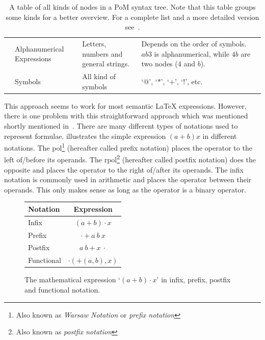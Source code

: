 \documentclass[a4paper,11pt]{article}
\theoremstyle{defTheoStyle}
\theoremstyle{defExampStyle}
\begin{document}
\begin{table}[t!]
\begin{tabularx}{\textwidth}{Y{1.55cm} Y{2.5cm} L L}
	 & Alphanumerical Expressions & Letters, numbers and general strings. & Depends on the order of symbols. $ab3$ is alphanumerical, while $4b$ are two nodes ($4$ and $b$).\\
	 & Symbols & All kind of symbols & `$@$', `$*$', `$+$', `$!$', etc.\\
	\hline
\end{tabularx}
\caption{A table of all kinds of nodes in a PoM syntax tree. Note that this table groups some kinds for a better overview. For a complete list and a more detailed version see~\parencite{POM-Tagger}.}
\label{tab:allTypesTable}
\end{table} 
This approach seems to work for most semantic \LaTeX{} expressions. However, there is one problem with this straightforward approach which was mentioned shortly mentioned in~. There are many different types of notations used to represent formulae.  illustrates the simple expression $(a+b)x$ in different notations. The \gls*{pol}\footnote{Also known as \textit{Warsaw Notation} or \textit{prefix notation}} (hereafter called prefix notation) places the operator to the left of/before its operands. The \gls*{rpol}\footnote{Also known as \textit{postfix notation}} (hereafter called postfix notation) does the opposite and places the operator to the right of/after its operands. The infix notation is commonly used in arithmetic and places the operator between their operands. This only makes sense as long as the operator is a binary operator.

\begin{figure}
\vspace{-10pt}
\begin{minipage}{0.38\textwidth}
\center
\begin{tabular}{lc}
	\hline
	Notation & Expression \\
	\hline
	Infix & $(a+b) \cdot x$\\
	Prefix & $\cdot + a\ b\ x$\\
	Postfix & $a\ b + x\ \cdot$\\
	Functional & $\cdot(+(a, b), x)$\\
	\hline
\end{tabular}
\vspace{-5pt}
\caption{The mathematical expression `$(a+b) \cdot x$' in infix, prefix, postfix and functional notation.}
\label{tab:notations}
\end{minipage}
\vspace{-5pt}
\end{figure}
\end{document}
